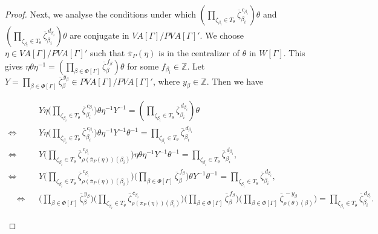 \documentclass[12pt]{amsart}
\numberwithin{equation}{section}
\begin{document}
\begin{proof}
Next, we analyse the conditions under which  $(\prod_{\zeta_{\beta_i}\in T_{\theta}} \overline{\zeta}_{\beta_i}^{\, c_{\beta_i}})\theta$ and $(\prod_{\zeta_{\beta_i}\in T_{\theta}} \overline{\zeta}_{\beta_i}^{\, d_{\beta_i}})\theta$ are conjugate in $VA[\Gamma]/PVA[\Gamma]'$. We choose $\eta\in VA[\Gamma]/PVA[\Gamma]'$ such that $\overline{\pi}_P(\eta)$ is in the centralizer of $\theta$ in $W[\Gamma]$. This gives $\eta\theta\eta^{-1}= (\prod_{\beta\in \Phi[\Gamma]} \overline{\zeta}_{\beta}^{\, f_{\beta}})\theta$ for some $f_{\beta_i} \in \mathbb{Z}$. Let $Y=\prod_{\beta \in \Phi[\Gamma]}\overline{\zeta}_{\beta}^{\,y_\beta}\in PVA[\Gamma]/PVA[\Gamma]'$, where $y_\beta\in\mathbb Z$. Then we have
\begin{small}
\begin{eqnarray}
\nonumber & & Y\eta \Bigg(\prod_{\zeta_{\beta_i}\in T_{\theta}} \overline{\zeta}_{\beta_i}^{\, c_{\beta_i}} \Bigg) \theta\eta^{-1}Y^{-1}=(\prod_{\zeta_{\beta_i}\in T_{\theta}} \overline{\zeta}_{\beta_i}^{\,d_{\beta_i}})\theta\\
\nonumber  \Leftrightarrow & & Y\eta \Bigg(\prod_{\zeta_{\beta_i}\in T_{\theta}}\overline{\zeta}_{\beta_i}^{\,c_{\beta_i}}\Bigg) \theta\eta^{-1}Y^{-1}\theta^{-1}=\prod_{\zeta_{\beta_i}\in T_{\theta}} \overline{\zeta}_{\beta_i}^{\, d_{\beta_i}}\\
\nonumber  \Leftrightarrow & & Y \Bigg(\prod_{\zeta_{\beta_i}\in T_{\theta}} \overline{\zeta}_{{\rho(\overline{\pi}_P(\eta))(\beta_i)}}^{\,c_{\beta_i}}\Bigg) \eta\theta\eta^{-1}Y^{-1}\theta^{-1}=\prod_{\zeta_{\beta_i}\in T_{\theta}} \overline{\zeta}_{\beta_i}^{\,d_{\beta_i}} ,\\
\nonumber  \Leftrightarrow & & Y \Bigg(\prod_{\zeta_{\beta_i}\in T_{\theta}} \overline{\zeta}_{{\rho(\overline{\pi}_P(\eta))(\beta_i)}}^{\, c_{\beta_i}}\Bigg) \Bigg(\prod_{\beta \in \Phi[\Gamma]} \overline{\zeta}_{\beta}^{\,f_\beta} \Bigg) \theta Y^{-1}\theta^{-1}=\prod_{\zeta_{\beta_i}\in T_{\theta}} \overline{\zeta}_{\beta_i}^{\,d_{\beta_i}},\\
\label{mid equation} \quad \Leftrightarrow & & \Bigg(\prod_{\beta \in \Phi[\Gamma]}\overline{\zeta}_{\beta}^{\,y_\beta} \Bigg) \Bigg(\prod_{\zeta_{\beta_i} \in T_{\theta}} \overline{\zeta}_{{\rho(\overline{\pi}_P(\eta))(\beta_i)}}^{\,c_{\beta_i}} \Bigg) \Bigg(\prod_{\beta \in \Phi[\Gamma]} \overline{\zeta}_{\beta}^{\,f_\beta} \Bigg) \Bigg(\prod_{\beta \in \Phi[\Gamma]}\overline{\zeta}_{{\rho(\theta)(\beta)}}^{\, -y_\beta} \Bigg)=\prod_{\zeta_{\beta_i}\in T_{\theta}} \overline{\zeta}_{\beta_i}^{\,d_{\beta_i}}.
\end{eqnarray}
\end{small}



\end{proof}
\end{document}
